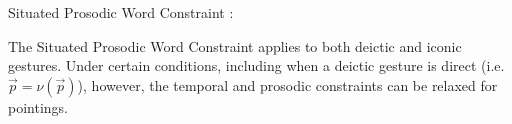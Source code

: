\documentclass[output=paper,biblatex,babelshorthands,newtxmath,draftmode,colorlinks,citecolor=brown]{langscibook}
\begin{document}
\ea
\label{ex:pwc}
Situated Prosodic Word Constraint \protect\citep[]{Alahverdzhieva:Lascarides:Flickinger:2017}:
\z

\noindent
The Situated Prosodic Word Constraint
applies to both deictic and iconic gestures.  Under certain conditions, including when a deictic
gesture is direct (i.e.\ $\vec{p} = \nu(\vec{p})$), however, the temporal and prosodic constraints
can be relaxed for pointings.
\end{document}
